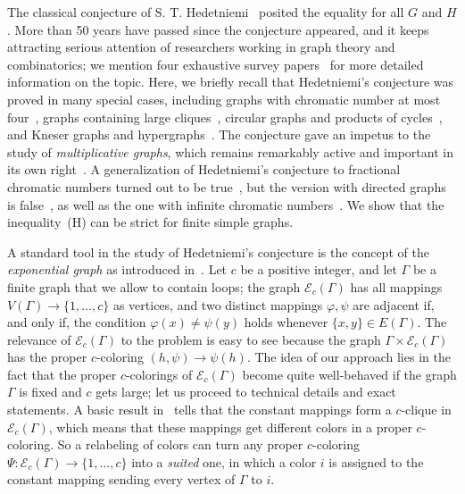 \documentclass{amsart}
\theoremstyle{definition}
\theoremstyle{remark}
\numberwithin{equation}{section}
\def\E{\mathcal{E}}
\def\E{\mathcal{E}}
\begin{document}
The classical conjecture of S. T. Hedetniemi~\cite{Hedetniemi} posited the equality for all $G$ and $H$. More than 50 years have passed since the conjecture appeared, and it keeps attracting serious attention of researchers working in graph theory and combinatorics; we mention four exhaustive survey papers~\cite{Klavzar, Sau, Tard, Zhu} for more detailed information on the topic. Here, we briefly recall that Hedetniemi's conjecture was proved in many special cases, including graphs with chromatic number at most four~\cite{EZS}, graphs containing large cliques~\cite{BEL, DSW, Wel}, circular graphs and products of cycles~\cite{VPV}, and Kneser graphs and hypergraphs~\cite{HM}. The conjecture gave an impetus to the study of \textit{multiplicative graphs}, which remains remarkably active and important in its own right~\cite{HHMNL, Tard2, Wrochna}. A generalization of Hedetniemi's conjecture to fractional chromatic numbers turned out to be true~\cite{Zhu2}, but the version with directed graphs is false~\cite{PR}, as well as the one with infinite chromatic numbers~\cite{Haj, Rin}. We show that the inequality~(H) can be strict for finite simple graphs.

\bigskip






A standard tool in the study of Hedetniemi's conjecture is the concept of the \textit{exponential graph} as introduced in~\cite{EZS}. Let $c$ be a positive integer, and let $\Gamma$ be a finite graph that we allow to contain loops; the graph $\E_c(\Gamma)$ has all mappings $V(\Gamma)\to\{1,\ldots,c\}$ as vertices, and two distinct mappings $\varphi,\psi$ are adjacent if, and only if, the condition $\varphi(x)\neq\psi(y)$ holds whenever $\{x,y\}\in E(\Gamma)$. The relevance of $\E_c(\Gamma)$ to the problem is easy to see because the graph $\Gamma\times\E_c(\Gamma)$ has the proper $c$-coloring $(h,\psi)\to\psi(h)$. The idea of our approach lies in the fact that the proper $c$-colorings of $\E_c(\Gamma)$ become quite well-behaved if the graph $\Gamma$ is fixed and $c$ gets large; let us proceed to technical details and exact statements.
A basic result in~\cite{EZS} tells that the constant mappings form a $c$-clique in $\E_c(\Gamma)$, which means that these mappings get different colors in a proper $c$-coloring. So a relabeling of colors can turn any proper $c$-coloring $\Psi:\E_c(\Gamma)\to\{1,\ldots,c\}$ into a \textit{suited} one, in which a color $i$ is assigned to the constant mapping sending every vertex of $\Gamma$ to $i$.
\end{document}
